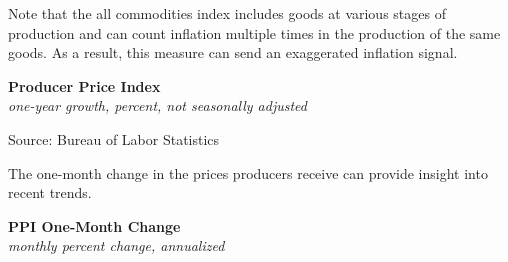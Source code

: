 \documentclass{report}
\makeatletter
\newcommand{\tbllink}[1]{\href{https://raw.githubusercontent.com/bdecon/US-chartbook/master/chartbook/data/#1}{\faTable}}
\newcommand*\short[1]{\expandafter\@gobbletwo\number\numexpr#1\relax}
\newcommand{\dateaxisticks}{
		date coordinates in=x, axis line style={draw=none},
		xmax={2022-10-31},
		max space between ticks=40,	    
		xtick={{1990-01-01}, {1992-01-01}, {1994-01-01}, 
			{1996-01-01}, {1998-01-01}, {2000-01-01}, 
			{2002-01-01}, {2004-01-01}, {2006-01-01},
			{2008-01-01}, {2010-01-01}, {2012-01-01}, {2014-01-01},
		    {2016-01-01}, {2018-01-01}, {2020-01-01}, {2022-01-01}, 
		    {2024-01-01}, {2026-01-01}},
		minor xtick={{1989-01-01}, {1991-01-01}, {1993-01-01},
			{1995-01-01}, {1997-01-01}, {1999-01-01}, 
			{2001-01-01}, {2003-01-01}, {2005-01-01}, {2007-01-01},
		    {2009-01-01}, {2011-01-01}, {2013-01-01}, {2015-01-01},
		    {2017-01-01}, {2019-01-01}, {2021-01-01}, {2023-01-01}, 
		    {2025-01-01}, {2027-01-01}},
		enlarge y limits={0.06}, enlarge x limits={0.01},
		}
\newcommand{\bbar}[2]{extra #1 ticks = {{#2}}, extra #1 tick labels = ,
		extra #1 tick style = {grid=major, grid style={thick, black!25}},}
\newcommand{\stdline}[4]{\addplot[very thick, no markers, color=#1] 
		table [x=#2, y=#3, col sep=comma] {#4};	}
\newcommand{\rbars}{
		\fill[color=black!10] (axis cs:{1990-07-01},\pgfkeysvalueof{/pgfplots/ymin}) rectangle 
			(axis cs:{1991-03-01}, \pgfkeysvalueof{/pgfplots/ymax});
		\fill[color=black!10] (axis cs:{2007-12-01},\pgfkeysvalueof{/pgfplots/ymin}) rectangle 
			(axis cs:{2009-07-01}, \pgfkeysvalueof{/pgfplots/ymax});
		\fill[color=black!10] (axis cs:{2001-03-01},\pgfkeysvalueof{/pgfplots/ymin}) rectangle 
			(axis cs:{2001-11-01}, \pgfkeysvalueof{/pgfplots/ymax});
		\fill[color=black!10] (axis cs:{2020-02-01},\pgfkeysvalueof{/pgfplots/ymin}) rectangle 
			(axis cs:{2020-05-01}, \pgfkeysvalueof{/pgfplots/ymax});}
\makeatother
\begin{document}
{\begin{minipage}{0.76\textwidth}
\small 

Note that the all commodities index includes goods at various stages of production and can count inflation multiple times in the production of the same goods. As a result, this measure can send an exaggerated inflation signal. 
\vspace{1mm}

\normalsize \textbf{Producer Price Index}\\
\footnotesize{\textit{one-year growth, percent, not seasonally adjusted}}
\vspace{2.9cm}

\hspace{4mm} 

\footnotesize{Source: Bureau of Labor Statistics} \hfill \tbllink{ppi.csv}
\vspace{2mm}

\small The one-month change in the prices producers receive can provide insight into recent trends. 
\vspace{1mm}

\normalsize \textbf{PPI One-Month Change}\\
\footnotesize{\textit{monthly percent change, annualized}}
\vspace{2.9cm}


\end{minipage}}
\end{document}
